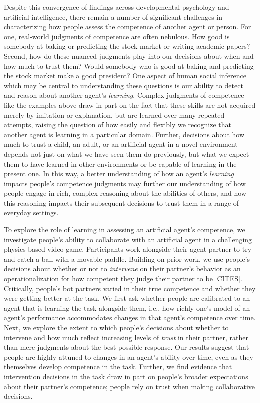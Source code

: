 \documentclass[10pt,letterpaper]{article}
\begin{document}
Despite this convergence of findings across developmental psychology and artificial intelligence, there remain a number of significant challenges in characterizing how people assess the competence of another agent or person. For one, real-world judgments of competence are often nebulous. How good is somebody at baking or predicting the stock market or writing academic papers? Second, how do these nuanced judgments play into our decisions about when and how much to trust them? Would somebody who is good at baking and predicting the stock market make a good president? One aspect of human social inference which may be central to understanding these questions is our ability to detect and reason about another agent's \textit{learning}. Complex judgments of competence like the examples above draw in part on the fact that these skills are not acquired merely by imitation or explanation, but are learned over many repeated attempts, raising the question of how easily and flexibly we recognize that another agent is learning in a particular domain. Further, decisions about how much to trust a child, an adult, or an artificial agent in a novel environment depends not just on what we have seen them do previously, but what we expect them to have learned in other environments or be capable of learning in the present one. In this way, a better understanding of how an agent's \textit{learning} impacts people's competence judgments may further our understanding of how people engage in rich, complex reasoning about the abilities of others, and how this reasoning impacts their subsequent decisions to trust them in a range of everyday settings.

To explore the role of learning in assessing an artificial agent's competence, we investigate people's ability to collaborate with an artificial agent in a challenging physics-based video game. Participants work alongside their agent partner to try and catch a ball with a movable paddle. Building on prior work, we use people's decisions about whether or not to \textit{intervene} on their partner's behavior as an operationalization for how competent they judge their partner to be [CITES]. Critically, people's bot partners varied in their true competence and whether they were getting better at the task. We first ask whether people are calibrated to an agent that is learning the task alongside them, i.e., how richly one's model of an agent's performance accommodates changes in that agent's competence over time. Next, we explore the extent to which people's decisions about whether to intervene and how much reflect increasing levels of \textit{trust} in their partner, rather than mere judgments about the best possible response. Our results suggest that people are highly attuned to changes in an agent's ability over time, even as they themselves develop competence in the task. Further, we find evidence that intervention decisions in the task draw in part on people's broader expectations about their partner's competence; people rely on trust when making collaborative decisions.
\end{document}
